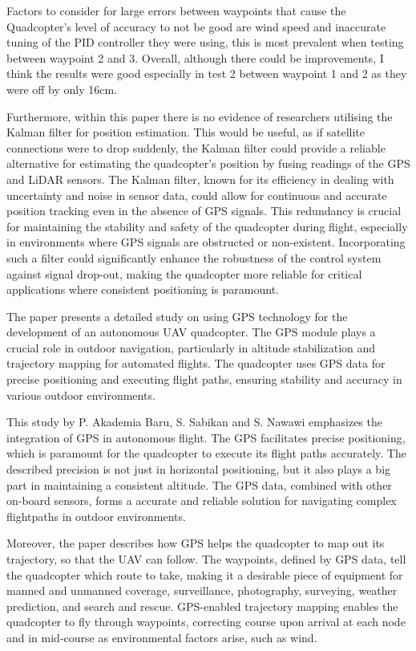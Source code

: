 \documentclass{report}
\begin{document}
Factors to consider for large errors between waypoints that cause the
Quadcopter's level of accuracy to not be good are wind speed and inaccurate
tuning of the PID controller they were using, this is most prevalent when
testing between waypoint 2 and 3. Overall, although there could be improvements,
I think the results were good especially in test 2 between waypoint 1 and 2 as
they were off by only 16cm.

Furthermore, within this paper there is no evidence of researchers utilising the Kalman filter for position estimation. This would be useful, as if satellite connections were to drop suddenly, the Kalman filter could provide a reliable alternative for estimating the quadcopter's position by fusing readings of the GPS and LiDAR sensors. The Kalman filter, known for its efficiency in dealing with uncertainty and noise in sensor data, could allow for continuous and accurate position tracking even in the absence of GPS signals. This redundancy is crucial for maintaining the stability and safety of the quadcopter during flight, especially in environments where GPS signals are obstructed or non-existent. Incorporating such a filter could significantly enhance the robustness of the control system against signal drop-out, making the quadcopter more reliable for critical applications where consistent positioning is paramount.

The paper presents a detailed study on using GPS technology for the development
of an autonomous UAV quadcopter. The GPS module plays a crucial role in outdoor
navigation, particularly in altitude stabilization and trajectory mapping for
automated flights. The quadcopter uses GPS data for precise positioning and
executing flight paths, ensuring stability and accuracy in various outdoor
environments.

This study \cite{AkademiaBaru2016}  by P. Akademia Baru, S. Sabikan and S. Nawawi emphasizes the integration of GPS in
autonomous flight. The GPS facilitates precise positioning, which is paramount
for the quadcopter to execute its flight paths accurately. The described
precision is not just in horizontal positioning, but it also plays a big part in
maintaining a consistent altitude. The GPS data, combined with other on-board
sensors, forms a accurate and reliable solution for navigating complex
flightpaths in outdoor environments.

Moreover, the paper describes how GPS helps the quadcopter to map out its
trajectory, so that the UAV can follow. The waypoints, defined by GPS data, tell
the quadcopter which route to take, making it a desirable piece of equipment for
manned and unmanned coverage, surveillance, photography, surveying, weather
prediction, and search and rescue. GPS-enabled trajectory mapping enables the
quadcopter to fly through waypoints, correcting course upon arrival at each node
and in mid-course as environmental factors arise, such as wind.
\end{document}
